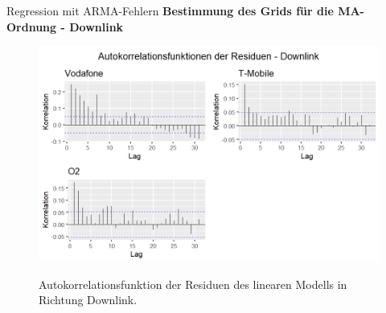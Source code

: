 \documentclass[10pt]{beamer}
\begin{document}
\begin{frame}{Regression mit ARMA-Fehlern}
	\textbf{Bestimmung des Grids für die MA-Ordnung - Downlink}
	\begin{figure}
		\includegraphics[scale=0.38]{plots/arima/downlink/res_acf}\\
		\caption{Autokorrelationsfunktion der Residuen des linearen Modells in Richtung Downlink.}
		\label{res_acf_dl}
	\end{figure}	
\end{frame}
\end{document}
